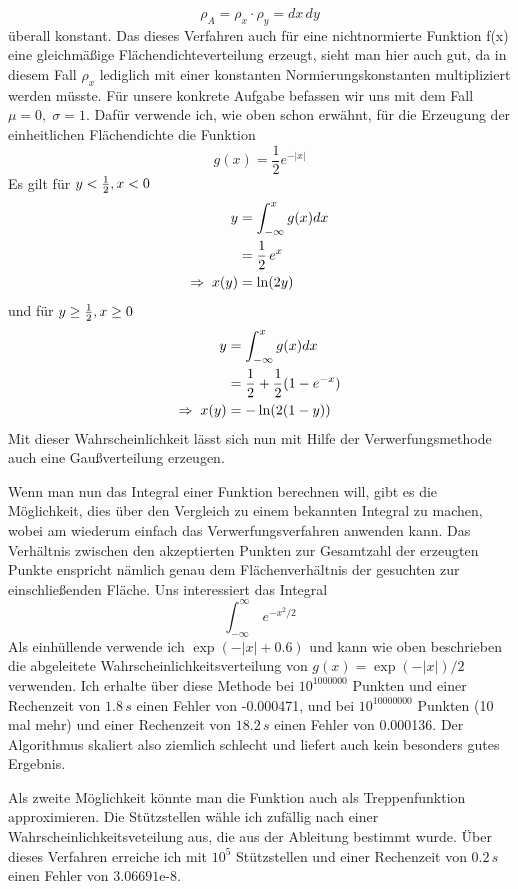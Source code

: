 \documentclass[12pt]{article}
\begin{document}
$$\rho_A=\rho_x\cdot\rho_y=dx\,dy$$
überall konstant. Das dieses Verfahren auch für eine nichtnormierte Funktion f(x) eine gleichmäßige Flächendichteverteilung erzeugt, sieht man hier auch gut, da in diesem Fall $\rho_x$ lediglich mit einer konstanten Normierungskonstanten multipliziert werden müsste.\newline
Für unsere konkrete Aufgabe befassen wir uns mit dem Fall $\mu=0,\;\sigma=1$. Dafür verwende ich, wie oben schon erwähnt, für die Erzeugung der einheitlichen Flächendichte die Funktion
$$g(x)=\frac{1}{2}{e}^{-|x|}$$
Es gilt
für $y<\frac{1}{2},x<0$
\begin{align*}
y &= \int_{-\infty}^xg(x)dx\\
&=\frac{1}{2}\,e^x\\
\Rightarrow\;x(y)&=\ln(2y)\end{align*}
und für $y\geq\frac{1}{2},x\geq0$
\begin{align*}
    y&=\int_{-\infty}^xg(x)dx\\
    &=\frac{1}{2}+\frac{1}{2}(1-e^{-x})\\
    \Rightarrow\;x(y)&=-\ln(2(1-y))
\end{align*}
Mit dieser Wahrscheinlichkeit lässt sich nun mit Hilfe der Verwerfungsmethode auch eine Gaußverteilung erzeugen. 

Wenn man nun das Integral einer Funktion berechnen will, gibt es die Möglichkeit, dies über den Vergleich zu einem bekannten Integral zu machen, wobei am wiederum einfach das Verwerfungsverfahren anwenden kann. Das Verhältnis zwischen den akzeptierten Punkten zur Gesamtzahl der erzeugten Punkte enspricht nämlich genau dem Flächenverhältnis der gesuchten zur einschließenden Fläche.
Uns interessiert das Integral
$$\int_{-\infty}^\infty\,e^{-x^2/2}$$
Als einhüllende verwende ich $\exp(-|x|+0.6)$ und kann wie oben beschrieben die abgeleitete Wahrscheinlichkeitsverteilung von $g(x)=\exp(-|x|)/2$ verwenden.
Ich erhalte über diese Methode bei $10^{1000000}$ Punkten und einer Rechenzeit von $1.8\,s$ einen Fehler von -0.000471, und bei $10^{10000000}$ Punkten (10 mal mehr) und einer Rechenzeit von $18.2\,s$ einen Fehler von 0.000136. Der Algorithmus skaliert also ziemlich schlecht und liefert auch kein besonders gutes Ergebnis.

Als zweite Möglichkeit könnte man die Funktion auch als Treppenfunktion approximieren. Die Stützstellen wähle ich zufällig nach einer Wahrscheinlichkeitsveteilung aus, die aus der Ableitung bestimmt wurde. Über dieses Verfahren erreiche ich mit $10^5$ Stützstellen und einer Rechenzeit von $0.2\,s$ einen Fehler von $3.06691\text{e-8}$.
\end{document}
